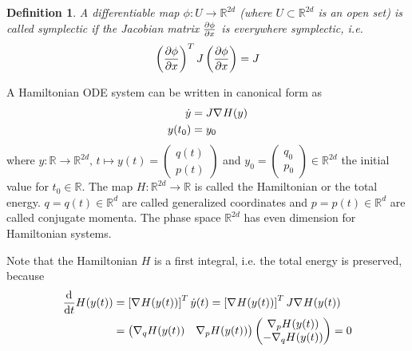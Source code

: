 \documentclass[twoside,a4paper]{article}
\newtheorem{definition}{Definition}
\begin{document}
\begin{definition}
	A differentiable map $\phi : U \to \mathbb{R}^{2d}$ (where $U \subset \mathbb{R}^{2d}$ is an open set)
	is called symplectic if the Jacobian matrix $\jac{\phi}{x}$ is everywhere symplectic, i.e.
	\begin{equation*}
		\lb \jac{\phi}{x} \rb^T J \lb \jac{\phi}{x} \rb = J
	\end{equation*}
\end{definition}

A Hamiltonian ODE system can be written in canonical form as
\begin{align*}
	\dot{y} &= J \grad{H}(y) \\
	y(t_0) &= y_0
\end{align*}
where $y: \mathbb{R} \to \mathbb{R}^{2d},\, t \mapsto y(t) = \begin{pmatrix}
	q(t) \\
	p(t)
\end{pmatrix}$ and $y_0 = \begin{pmatrix}
	q_0 \\
	p_0
\end{pmatrix} \in \mathbb{R}^{2d}$ the initial value for $t_0 \in \mathbb{R}$. 
The map $H: \mathbb{R}^{2d} \to \mathbb{R}$ is called the Hamiltonian 
or the total energy. $q = q(t) \in \mathbb{R}^d$ are called generalized coordinates
and $p=p(t) \in \mathbb{R}^d$ are called conjugate momenta. 
The phase space $\mathbb{R}^{2d}$ has even dimension for Hamiltonian systems.

Note that the Hamiltonian $H$ is a first integral, i.e. the total energy is preserved, because
\begin{align*}
	\ddt H(y(t)) &= \lsb \grad{H}(y(t)) \rsb^T \dot{y}(t) = 
	\lsb \grad{H}(y(t)) \rsb^T J \grad{H}(y(t)) \\
	&= \begin{pmatrix}
		\grad[q]{H}(y(t)) & \grad[p]{H}(y(t))
	\end{pmatrix} \begin{pmatrix}
		\grad[p]{H}(y(t)) \\
		- \grad[q]{H}(y(t))
	\end{pmatrix} = 0
\end{align*}
\end{document}
